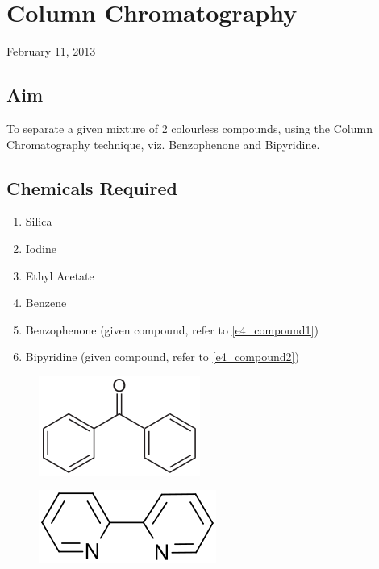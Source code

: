\chapter{Column Chromatography}
\begin{flushright}
February 11, 2013
\end{flushright}
\section{Aim}
To separate a given mixture of 2 colourless compounds, using the Column Chromatography technique, viz. Benzophenone and Bipyridine.

\section {Chemicals Required}
	\begin{enumerate}
		\item Silica
		\item Iodine
		\item Ethyl Acetate
		\item Benzene
		\item Benzophenone (given compound, refer to \autoref{e4_compound1})
		\item Bipyridine (given compound, refer to \autoref{e4_compound2})
	\end{enumerate}

	\begin{figure}[bth]
		\begin{center}
			\includegraphics[width=0.4\linewidth]{gfx/e4_compound1}
		\end{center}
	\caption[Benzophenone]{\label{e4_compound1}}
	\end{figure}

	\begin{figure}[bth]
		\begin{center}
			\includegraphics[width=0.4\linewidth]{gfx/e4_compound2}
		\end{center}
	\caption[Bipyridine]{\label{e4_compound2}}
	\end{figure}

